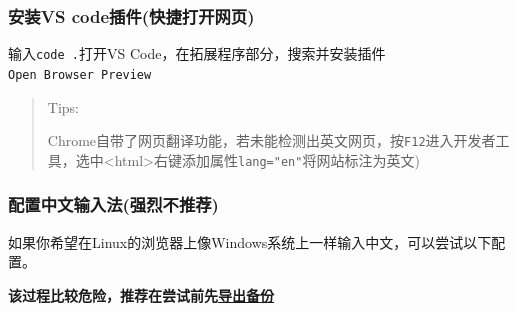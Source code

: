 \documentclass[
]{article}
\begin{document}
\subsubsection{安装VS
	code插件(快捷打开网页)}\label{ux5b89ux88c5vs-codeux63d2ux4ef6ux5febux6377ux6253ux5f00ux7f51ux9875}

输入\texttt{code\ .}打开VS
Code，在拓展程序部分，搜索并安装插件\texttt{Open\ Browser\ Preview}

\begin{quote}
	Tips:

	Chrome自带了网页翻译功能，若未能检测出英文网页，按\texttt{F12}进入开发者工具，选中\textless{}html\textgreater 右键添加属性\texttt{lang="en"}将网站标注为英文)
\end{quote}

\subsubsection{配置中文输入法(强烈不推荐)}\label{ux914dux7f6eux4e2dux6587ux8f93ux5165ux6cd5ux5f3aux70c8ux4e0dux63a8ux8350}

如果你希望在Linux的浏览器上像Windows系统上一样输入中文，可以尝试以下配置。

\textbf{该过程比较危险，推荐在尝试前先\hyperref[export]{导出备份}}
\end{document}
